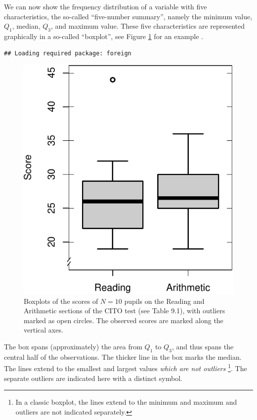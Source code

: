 \documentclass[
]{book}
\begin{document}
We can now show the frequency distribution of a variable with five
characteristics, the so-called ``five-number summary'', namely the minimum value, \(Q_1\),
median, \(Q_3\), and maximum value. These five characteristics are represented graphically
in a so-called ``boxplot'', see
Figure \ref{fig:cito-boxplot}
for an example \citep[ §2C]{Tukey77}.

\begin{verbatim}
## Loading required package: foreign
\end{verbatim}

\begin{figure}
\centering
\includegraphics{QMS-EN_files/figure-latex/cito-boxplot-1.pdf}
\caption{\label{fig:cito-boxplot}Boxplots of the scores of \(N=10\) pupils on the Reading and Arithmetic sections of the CITO test (see Table 9.1), with outliers marked as open circles. The observed scores are marked along the vertical axes.}
\end{figure}

The box spans (approximately) the area from \(Q_1\) to \(Q_3\), and
thus spans the central half of the observations. The thicker line in the
box marks the median. The lines extend to the smallest and largest
values \emph{which are not outliers} \footnote{In a classic boxplot, the lines extend to the minimum and maximum \citep{Tukey77} and
  outliers are not indicated separately.}. The separate outliers
are indicated here with a distinct symbol.
\end{document}
